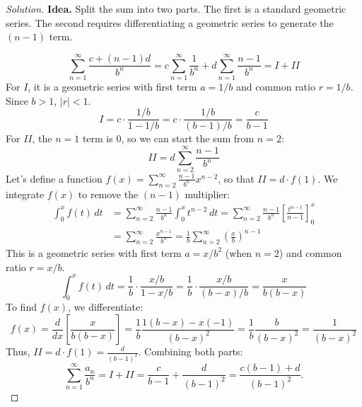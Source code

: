 \documentclass[11pt]{article}
\theoremstyle{definition}
\newenvironment{solution}{\begin{proof}[Solution]}{\end{proof}}
\begin{document}
\begin{solution}
\textbf{Idea.} Split the sum into two parts. The first is a standard geometric series. The second requires differentiating a geometric series to generate the $(n-1)$ term.

\[
\sum_{n=1}^{\infty} \frac{c+(n-1)d}{b^n} = c \sum_{n=1}^{\infty} \frac{1}{b^n} + d \sum_{n=1}^{\infty} \frac{n-1}{b^n} = I + II
\]
For $I$, it is a geometric series with first term $a = 1/b$ and common ratio $r = 1/b$. Since $b>1$, $|r| < 1$.
\[
I = c \cdot \frac{1/b}{1 - 1/b} = c \cdot \frac{1/b}{(b-1)/b} = \frac{c}{b-1}
\]
For $II$, the $n=1$ term is 0, so we can start the sum from $n=2$:
\[
II = d \sum_{n=2}^{\infty} \frac{n-1}{b^n}
\]
Let's define a function $f(x) = \sum_{n=2}^{\infty} \frac{n-1}{b^n} x^{n-2}$, so that $II = d \cdot f(1)$.
We integrate $f(x)$ to remove the $(n-1)$ multiplier:
\begin{align*}
\int_0^x f(t) \,dt &= \sum_{n=2}^{\infty} \frac{n-1}{b^n} \int_0^x t^{n-2} \,dt = \sum_{n=2}^{\infty} \frac{n-1}{b^n} \left[ \frac{t^{n-1}}{n-1} \right]_0^x \\
&= \sum_{n=2}^{\infty} \frac{x^{n-1}}{b^n} = \frac{1}{b} \sum_{n=2}^{\infty} \left(\frac{x}{b}\right)^{n-1}
\end{align*}
This is a geometric series with first term $a = x/b^2$ (when $n=2$) and common ratio $r = x/b$.
\[
\int_0^x f(t) \,dt = \frac{1}{b} \cdot \frac{x/b}{1 - x/b} = \frac{1}{b} \cdot \frac{x/b}{(b-x)/b} = \frac{x}{b(b-x)}
\]
To find $f(x)$, we differentiate:
\[
f(x) = \frac{d}{dx} \left[ \frac{x}{b(b-x)} \right] = \frac{1}{b} \frac{1(b-x) - x(-1)}{(b-x)^2} = \frac{1}{b} \frac{b}{(b-x)^2} = \frac{1}{(b-x)^2}
\]
Thus, $II = d \cdot f(1) = \frac{d}{(b-1)^2}$.
Combining both parts:
\[
\sum_{n=1}^{\infty}\frac{a_n}{b^n} = I + II = \frac{c}{b-1} + \frac{d}{(b-1)^2} = \frac{c(b-1)+d}{(b-1)^2}.
\]
\end{solution}
\end{document}
